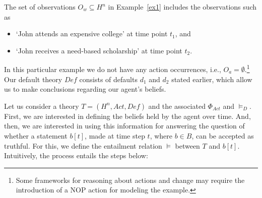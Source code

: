 \documentclass{article}
\begin{document}
The set of observations $O_w\subseteq H^n$ in Example~\ref{ex1} includes the observations such as 
\begin{itemize}
    \item `John attends an expensive college' at time point $t_1$, and 
    \item `John receives a need-based scholarship' at time point $t_2$.
\end{itemize}
 In this particular example we do not have any  action occurrences, i.e., $O_a = \emptyset$.\footnote{Some frameworks for reasoning about actions and change may require the introduction of a NOP action for modeling the example.} Our default theory $Def$ consists of defaults $d_1$ and $d_2$ stated earlier, which allow us to make conclusions regarding our agent's beliefs. 

Let us consider a theory $T = (H^n, Act, \textit{Def})$ and the associated $\Phi_{Act}$ and $\models_D$. First, we are interested in defining the beliefs held by the agent over time. And, then, we are interested in using this information for answering the question of whether a statement $b[t]$,  made at time step $t$, where $b \in B$, can be accepted as truthful. For this, we define the entailment relation $\models$ between $T$ and $b[t]$. Intuitively, the process entails the steps below: %
\end{document}
